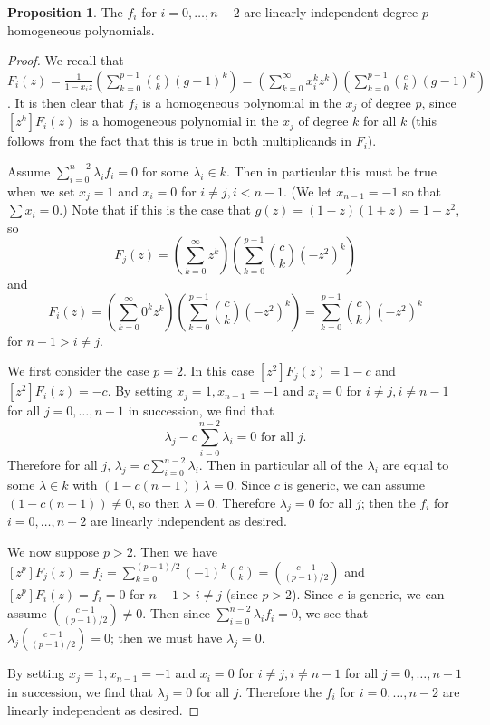 \documentclass{amsart}
\numberwithin{equation}{section}
\theoremstyle{definition}
\newtheorem{proposition}[theorem]{Proposition}
\begin{document}
\begin{proposition}\label{prop:linind} The $f_i$ for $i=0,\dots,n-2$ are linearly independent degree $p$ homogeneous polynomials.
\end{proposition} 

\begin{proof} 
We recall that $F_i(z)=\frac{1}{1-x_iz}\left(\sum_{k=0}^{p-1} \binom{c}{k} (g-1)^k\right)=\left(\sum_{k=0}^\infty x_i^kz^k\right)\left(\sum_{k=0}^{p-1} \binom{c}{k} (g-1)^k\right)$. It is then clear that $f_i$ is a homogeneous polynomial in the $x_j$ of degree $p$, since $[z^k]F_i(z)$ is a homogeneous polynomial in the $x_j$ of degree $k$ for all $k$ (this follows from the fact that this is true in both multiplicands in $F_i$). 

Assume $\sum_{i=0}^{n-2} \lambda_if_i=0$ for some $\lambda_i \in k$. Then in particular this must be true when we set $x_j=1$ and $x_i=0$ for $i \ne j,i < n-1$. (We let $x_{n-1}=-1$ so that $\sum x_i=0$.) Note that if this is the case that $g(z)=(1-z)(1+z)=1-z^2$, so 
\[
F_j(z)=\left(\sum_{k=0}^\infty z^k\right)\left(\sum_{k=0}^{p-1} \binom{c}{k} (-z^2)^k\right)
\]
and 
\[
F_i(z)=\left(\sum_{k=0}^\infty 0^kz^k\right)\left(\sum_{k=0}^{p-1} \binom{c}{k} (-z^2)^k\right)=\sum_{k=0}^{p-1} \binom{c}{k} (-z^2)^k
\]
for $n-1>i \ne j$.

We first consider the case $p=2$. In this case $[z^2]F_j(z)=1-c$ and $[z^2]F_i(z)=-c$. By setting $x_j=1,x_{n-1}=-1$ and $x_i=0$ for $i \ne j, i \ne n-1$ for all $j=0,\dots,n-1$ in succession, we find that 
\[
\lambda_j-c\sum_{i=0}^{n-2} \lambda_i = 0 \text{ for all }j.
\]
Therefore for all $j$, $\lambda_j=c\sum_{i=0}^{n-2} \lambda_i$. Then in particular all of the $\lambda_i$ are equal to some $\lambda \in k$ with $(1-c(n-1))\lambda = 0$. Since $c$ is generic, we can assume $(1-c(n-1)) \ne 0$, so then $\lambda=0$. Therefore $\lambda_j=0$ for all $j$; then the $f_i$ for $i=0,\dots,n-2$ are linearly independent as desired.


We now suppose $p>2$. Then we have $[z^p]F_j(z)=f_j=\sum_{k=0}^{(p-1)/2} (-1)^k\binom{c}{k}=\binom{c-1}{(p-1)/2}$ and $[z^p]F_i(z)=f_i=0$ for $n-1>i \ne j$ (since $p > 2$). Since $c$ is generic, we can assume $\binom{c-1}{(p-1)/2} \ne 0$. Then since $\sum_{i=0}^{n-2} \lambda_if_i=0$, we see that $\lambda_j\binom{c-1}{(p-1)/2}=0$; then we must have $\lambda_j=0$.

By setting $x_j=1,x_{n-1}=-1$ and $x_i=0$ for $i \ne j, i \ne n-1$ for all $j=0,\dots,n-1$ in succession, we find that $\lambda_j=0$ for all $j$. Therefore the $f_i$ for $i=0,\dots,n-2$ are linearly independent as desired.
\end{proof}
\end{document}

